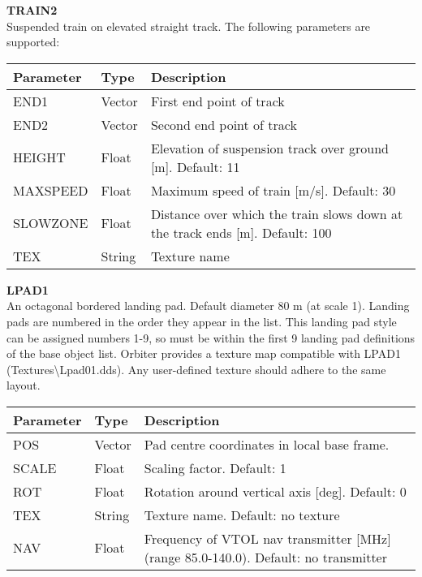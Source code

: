 \documentclass[Orbiter Developer Manual.tex]{subfiles}
\begin{document}
\noindent
\textbf{TRAIN2}\\
Suspended train on elevated straight track. The following parameters are supported:

	\begin{longtable}{ |p{}|p{}|p{}| }
	\hline\rule{0pt}{2ex}
	\textbf{Parameter} & \textbf{Type} & \textbf{Description}\\
	\hline\rule{0pt}{2ex}
	END1 & Vector & First end point of track\\
	\hline\rule{0pt}{2ex}
	END2 & Vector & Second end point of track\\
	\hline\rule{0pt}{2ex}
	HEIGHT & Float & Elevation of suspension track over ground [m]. Default: 11\\
	\hline\rule{0pt}{2ex}
	MAXSPEED & Float & Maximum speed of train [m/s]. Default: 30\\
	\hline\rule{0pt}{2ex}
	SLOWZONE & Float & Distance over which the train slows down at the track ends [m]. Default: 100\\
	\hline\rule{0pt}{2ex}
	TEX & String & Texture name\\
	\hline
	\end{longtable}

\noindent
\textbf{LPAD1}\\
An octagonal bordered landing pad. Default diameter 80 m (at scale 1). Landing pads are numbered in the order they appear in the list. This landing pad style can be assigned numbers 1-9, so must be within the first 9 landing pad definitions of the base object list. Orbiter provides a texture map compatible with LPAD1 (Textures\textbackslash Lpad01.dds). Any user-defined texture should adhere to the same layout.

	\begin{longtable}{ |p{}|p{}|p{}| }
	\hline\rule{0pt}{2ex}
	\textbf{Parameter} & \textbf{Type} & \textbf{Description}\\
	\hline\rule{0pt}{2ex}
	POS & Vector & Pad centre coordinates in local base frame.\\
	\hline\rule{0pt}{2ex}
	SCALE & Float & Scaling factor. Default: 1\\
	\hline\rule{0pt}{2ex}
	ROT & Float & Rotation around vertical axis [deg]. Default: 0\\
	\hline\rule{0pt}{2ex}
	TEX & String & Texture name. Default: no texture\\
	\hline\rule{0pt}{2ex}
	NAV & Float & Frequency of VTOL nav transmitter [MHz] (range 85.0-140.0). Default: no transmitter\\
	\hline
	\end{longtable}
\end{document}
